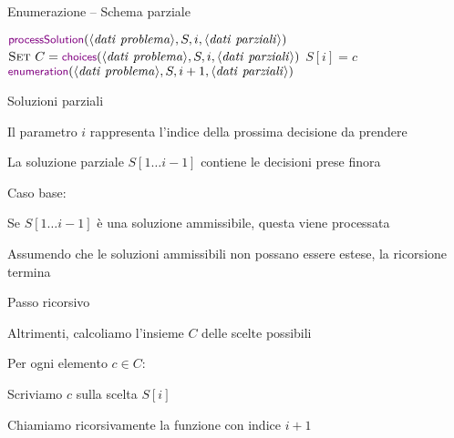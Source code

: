 \begin{frame}{Enumerazione -- Schema parziale}

\vspace{-9pt}
\begin{Procedure}
\caption[A]{\textcolor{violet}{\enumerazione}($\langle \mathit{dati\ problema} \rangle$, $\Item[\,]\ S$, \INTEGER\ $i$, $\langle \mathit{dati\ parziali} \rangle)$}
{
  $\textcolor{violet}{\textsf{{\small processSolution}}}(\langle \mathit{dati\ problema} \rangle, S, i, \langle \mathit{dati\ parziali} \rangle)$\;
}
{
  $\textsc{Set}\ C = \textcolor{violet}{\textsf{{\small choices}}}(\langle \mathit{dati\ problema} \rangle, S, i, \langle \mathit{dati\ parziali} \rangle)$\;
  {
    $S[i] = c$\;
    $\textcolor{violet}{\textsf{{\small enumeration}}}(\langle \mathit{dati\ problema} \rangle, S, i+1, \langle \mathit{dati\ parziali} \rangle)$
  }
}
\end{Procedure}

\end{frame}

\begin{frame}{Soluzioni parziali}

\BIL
\item Il parametro $i$ rappresenta l'indice della prossima decisione da prendere
\item La soluzione parziale $S[1 \ldots i-1]$ contiene le decisioni prese finora
\item \alert{Caso base}: 
  \BI
  \item Se $S[1 \ldots i-1]$ è una soluzione ammissibile, questa   viene processata
  \item Assumendo che le soluzioni ammissibili non possano essere estese, la ricorsione termina 
  \EI
\item \alert{Passo ricorsivo}  
  \BI
  \item Altrimenti, calcoliamo l'insieme $C$ delle scelte possibili 
  \item Per ogni elemento $c \in C$:
    \BI
    \item Scriviamo $c$ sulla scelta $S[i]$
    \item Chiamiamo ricorsivamente la funzione con indice $i+1$
    \EI
  \EI
\EIL

\end{frame}

